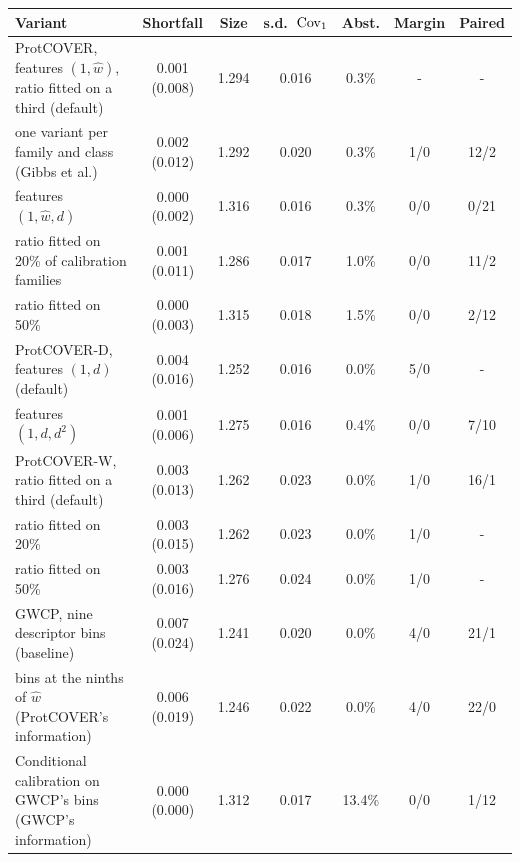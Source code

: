 \begin{tabular}{>{\raggedright\arraybackslash}p{5.4cm}cccccc}
\toprule
Variant & Shortfall & Size & s.d.\ $\mathrm{Cov}_1$ & Abst. & Margin & Paired \\
\midrule
ProtCOVER, features $(1,\hat w)$, ratio fitted on a third (default) & 0.001 (0.008) & 1.294 & 0.016 & 0.3\% & - & - \\
\quad one variant per family and class (Gibbs et al.) & 0.002 (0.012) & 1.292 & 0.020 & 0.3\% & 1/0 & 12/2 \\
\quad features $(1,\hat w,d)$ & 0.000 (0.002) & 1.316 & 0.016 & 0.3\% & 0/0 & 0/21 \\
\quad ratio fitted on 20\% of calibration families & 0.001 (0.011) & 1.286 & 0.017 & 1.0\% & 0/0 & 11/2 \\
\quad ratio fitted on 50\% & 0.000 (0.003) & 1.315 & 0.018 & 1.5\% & 0/0 & 2/12 \\
ProtCOVER-D, features $(1,d)$ (default) & 0.004 (0.016) & 1.252 & 0.016 & 0.0\% & 5/0 & - \\
\quad features $(1,d,d^2)$ & 0.001 (0.006) & 1.275 & 0.016 & 0.4\% & 0/0 & 7/10 \\
ProtCOVER-W, ratio fitted on a third (default) & 0.003 (0.013) & 1.262 & 0.023 & 0.0\% & 1/0 & 16/1 \\
\quad ratio fitted on 20\% & 0.003 (0.015) & 1.262 & 0.023 & 0.0\% & 1/0 & - \\
\quad ratio fitted on 50\% & 0.003 (0.016) & 1.276 & 0.024 & 0.0\% & 1/0 & - \\
GWCP, nine descriptor bins (baseline) & 0.007 (0.024) & 1.241 & 0.020 & 0.0\% & 4/0 & 21/1 \\
\quad bins at the ninths of $\hat w$ (ProtCOVER's information) & 0.006 (0.019) & 1.246 & 0.022 & 0.0\% & 4/0 & 22/0 \\
Conditional calibration on GWCP's bins (GWCP's information) & 0.000 (0.000) & 1.312 & 0.017 & 13.4\% & 0/0 & 1/12 \\
\bottomrule
\end{tabular}
